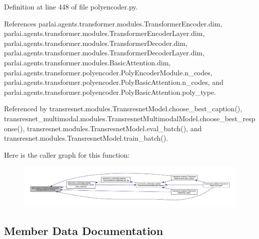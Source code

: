 Definition at line 448 of file polyencoder.\+py.



References parlai.\+agents.\+transformer.\+modules.\+Transformer\+Encoder.\+dim, parlai.\+agents.\+transformer.\+modules.\+Transformer\+Encoder\+Layer.\+dim, parlai.\+agents.\+transformer.\+modules.\+Transformer\+Decoder.\+dim, parlai.\+agents.\+transformer.\+modules.\+Transformer\+Decoder\+Layer.\+dim, parlai.\+agents.\+transformer.\+modules.\+Basic\+Attention.\+dim, parlai.\+agents.\+transformer.\+polyencoder.\+Poly\+Encoder\+Module.\+n\+\_\+codes, parlai.\+agents.\+transformer.\+polyencoder.\+Poly\+Basic\+Attention.\+n\+\_\+codes, and parlai.\+agents.\+transformer.\+polyencoder.\+Poly\+Basic\+Attention.\+poly\+\_\+type.



Referenced by transresnet.\+modules.\+Transresnet\+Model.\+choose\+\_\+best\+\_\+caption(), transresnet\+\_\+multimodal.\+modules.\+Transresnet\+Multimodal\+Model.\+choose\+\_\+best\+\_\+response(), transresnet.\+modules.\+Transresnet\+Model.\+eval\+\_\+batch(), and transresnet.\+modules.\+Transresnet\+Model.\+train\+\_\+batch().

Here is the caller graph for this function\+:
\nopagebreak
\begin{figure}[H]
\begin{center}
\leavevmode
\includegraphics[width=350pt]{classparlai_1_1agents_1_1transformer_1_1polyencoder_1_1PolyBasicAttention_a6927374c5336d0111ab936c1fd2b62ff_icgraph}
\end{center}
\end{figure}


\subsection{Member Data Documentation}
\mbox{\label{classparlai_1_1agents_1_1transformer_1_1polyencoder_1_1PolyBasicAttention_a45603a52525744549d48b10e0bd1b63c}} 

